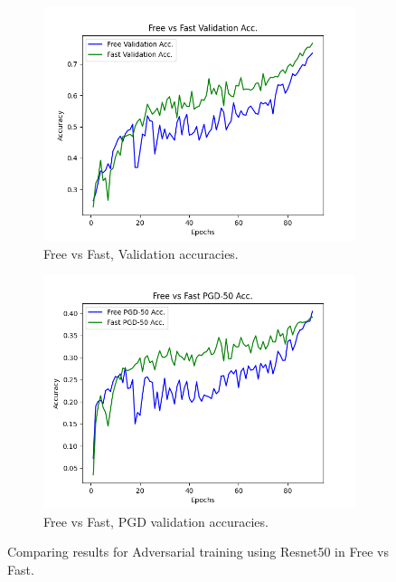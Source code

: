\documentclass{article}
\begin{document}
\begin{figure}[hbt!]
  \centering
  \begin{subfigure}[b]{0.4\linewidth}
    \includegraphics[width=\linewidth]{images/resComp/Figure_1.png}
    \caption{ Free vs Fast, Validation accuracies.}
  \end{subfigure}
  \begin{subfigure}[b]{0.4\linewidth}
    \includegraphics[width=\linewidth]{images/resComp/Figure_2.png}
    \caption{Free vs Fast, PGD validation accuracies.}
  \end{subfigure}
  \caption{Comparing results for Adversarial training using Resnet50 in Free vs Fast.}
  \label{fig:coffee}
\end{figure}
\end{document}
